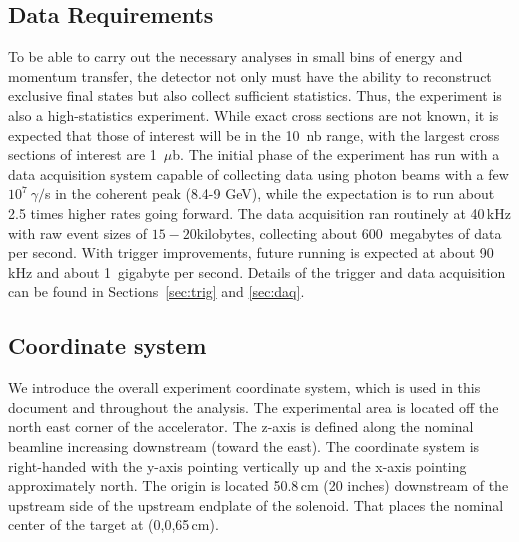\subsection{Data Requirements \label{sec:intro:data_requirements}}
To be able to carry out the necessary analyses in small bins of energy and momentum transfer, the detector not only must have the ability to reconstruct exclusive final states but also collect sufficient statistics. Thus, the \GX{} experiment is also a high-statistics experiment. While exact cross sections are not known, it is expected that those of interest will be in the 10~nb range, with the largest cross sections of interest are 1~$\mu$b. The initial phase of the \GX{} experiment has run with a data acquisition system capable of collecting data using photon beams with a few $10^{7}~\gamma/$s in the coherent peak (8.4-9 GeV), while the expectation is to run about 2.5 times higher rates going forward. The data acquisition ran routinely at 40\,kHz with raw event sizes of $15-20$kilobytes, collecting about 600~megabytes of data per second. With trigger improvements, future running is expected at about 90 kHz and about 1~gigabyte per second. Details of the trigger and data acquisition can be found in Sections~\ref{sec:trig} and \ref{sec:daq}.

\subsection{Coordinate system \label{sec:intro:coordinates}}
We introduce the overall experiment coordinate system, which is used in this document and throughout the analysis. The experimental area is located 
off the north east corner of the accelerator. The z-axis is defined along the nominal beamline increasing downstream (toward the east). The coordinate system 
is right-handed with the y-axis pointing vertically up and the x-axis pointing approximately north. 
The origin is located 50.8\,cm (20 inches) downstream of the upstream side of the upstream endplate of the solenoid. That places the nominal center of the target at (0,0,65\,cm).
